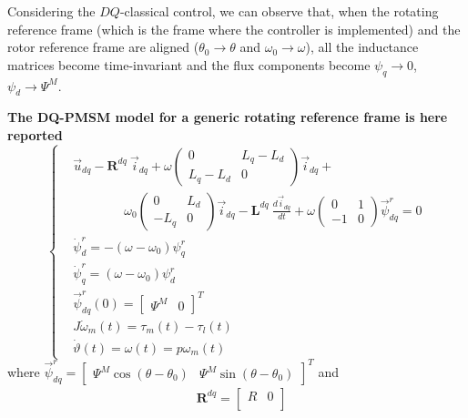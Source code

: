 \documentclass[11pt,a4paper,oneside]{book}
\numberwithin{equation}{section}
\theoremstyle{it}
\theoremstyle{definition}
\begin{document}
Considering the $DQ$-classical control, we can observe that, when the 
rotating reference frame (which is the frame where the controller is 
implemented) and the rotor reference frame are aligned ($\theta_0 
\rightarrow \theta$ and $\omega_0 \rightarrow \omega$), all the inductance 
matrices become time-invariant and the flux components become $\psi_{q} 
\rightarrow 0$, $\psi_{d} \rightarrow \Psi^M$. 

\begin{mybox}
	\textbf{The DQ-PMSM model for a generic rotating reference frame is 
		here reported}
	\begin{equation}\label{twophase_eq1bis}
		\left\lbrace \begin{aligned}
			& \vec{u}_{dq}-\mathbf{R}^{dq}\ \vec{i}_{dq} + 
			\omega\begin{pmatrix} 0 & L_q-L_d\\ L_q-L_d & 0 
			\end{pmatrix}\vec{i}_{dq} + \\[6pt]
			& \qquad\qquad \omega_0\begin{pmatrix} 0 & L_d\\ 
				-L_q & 0 \end{pmatrix}\vec{i}_{dq} - \mathbf{L}^{dq}\ 
			\frac{d\vec{i}_{dq}}{dt} + \omega\begin{pmatrix} 0 & 1\\-1 & 0 
			\end{pmatrix}\vec{\psi}_{dq}^r = 0 \\[6pt]
			&\dot{\psi}_d^r = -\left( \omega-\omega_0\right)\psi_q^r \\[6pt]
			&\dot{\psi}_q^r = \left( \omega-\omega_0\right)\psi_d^r \\[6pt]
			& \vec{\psi}^r_{dq}(0) = \begin{bmatrix} \Psi^M &  0 
			\end{bmatrix}^T \\[6pt]
			& J\dot{\omega}_m(t) = \tau_m(t)-\tau_l(t) \\[6pt]
			& \dot{\vartheta}(t) = \omega(t) = p\omega_m(t)
		\end{aligned} \right. 
	\end{equation}
	where $\vec{\psi}^r_{dq} = \begin{bmatrix} \Psi^M\cos(\theta-\theta_0) 
		&  \Psi^M\sin(\theta-\theta_0)\end{bmatrix}^T$ and
	\begin{equation*}
		\begin{aligned}
			& \mathbf{R}^{dq} = 
			\begin{bmatrix} R &  0 \\

\end{bmatrix}
\end{aligned}
\end{equation*}
\end{mybox}
\end{document}
